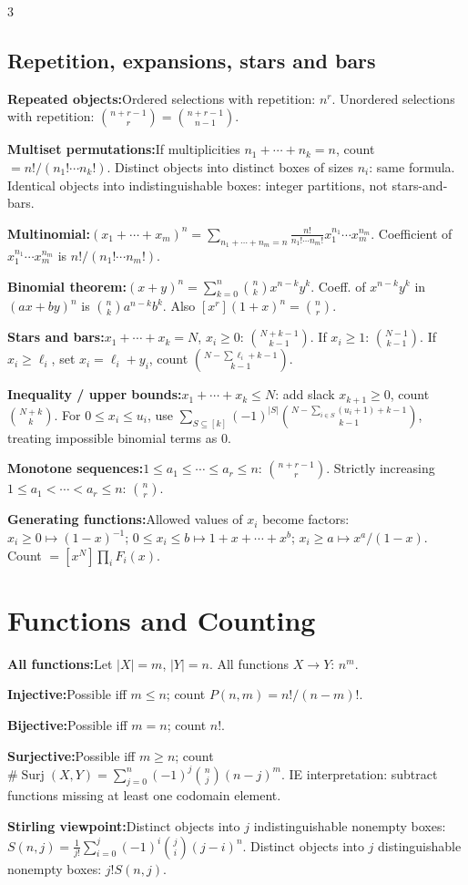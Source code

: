 \documentclass[10pt]{article}
\newcommand{\Surj}{\operatorname{Surj}}
\newenvironment{cheatitems}{\par\vspace{-1pt}}{\par\vspace{-1pt}}
\newcommand{\cheatrow}[2]{\par\noindent\textbf{#1:}\enspace #2\par}
\begin{document}
\begin{multicols}{3}
\subsection*{Repetition, expansions, stars and bars}
\begin{cheatitems}
\cheatrow{Repeated objects}{Ordered selections with repetition: $n^r$. Unordered selections with repetition: $\binom{n+r-1}{r}=\binom{n+r-1}{n-1}$.}
\cheatrow{Multiset permutations}{If multiplicities $n_1+\cdots+n_k=n$, count $=n!/(n_1!\cdots n_k!)$. Distinct objects into distinct boxes of sizes $n_i$: same formula. Identical objects into indistinguishable boxes: integer partitions, not stars-and-bars.}
\cheatrow{Multinomial}{$(x_1+\cdots+x_m)^n=\sum_{n_1+\cdots+n_m=n}\frac{n!}{n_1!\cdots n_m!}x_1^{n_1}\cdots x_m^{n_m}$. Coefficient of $x_1^{n_1}\cdots x_m^{n_m}$ is $n!/(n_1!\cdots n_m!)$.}
\cheatrow{Binomial theorem}{$(x+y)^n=\sum_{k=0}^{n}\binom nkx^{n-k}y^k$. Coeff. of $x^{n-k}y^k$ in $(ax+by)^n$ is $\binom nka^{n-k}b^k$. Also $[x^r](1+x)^n=\binom nr$.}
\cheatrow{Stars and bars}{$x_1+\cdots+x_k=N$, $x_i\ge0$: $\binom{N+k-1}{k-1}$. If $x_i\ge1$: $\binom{N-1}{k-1}$. If $x_i\ge\ell_i$, set $x_i=\ell_i+y_i$, count $\binom{N-\sum\ell_i+k-1}{k-1}$.}
\cheatrow{Inequality / upper bounds}{$x_1+\cdots+x_k\le N$: add slack $x_{k+1}\ge0$, count $\binom{N+k}{k}$. For $0\le x_i\le u_i$, use $\sum_{S\subseteq[k]}(-1)^{|S|}\binom{N-\sum_{i\in S}(u_i+1)+k-1}{k-1}$, treating impossible binomial terms as $0$.}
\cheatrow{Monotone sequences}{$1\le a_1\le\cdots\le a_r\le n$: $\binom{n+r-1}{r}$. Strictly increasing $1\le a_1<\cdots<a_r\le n$: $\binom nr$.}
\cheatrow{Generating functions}{Allowed values of $x_i$ become factors: $x_i\ge0\mapsto(1-x)^{-1}$; $0\le x_i\le b\mapsto1+x+\cdots+x^b$; $x_i\ge a\mapsto x^a/(1-x)$. Count $=[x^N]\prod_iF_i(x)$.}
\end{cheatitems}

\section*{Functions and Counting}
\begin{cheatitems}
\cheatrow{All functions}{Let $|X|=m$, $|Y|=n$. All functions $X\to Y$: $n^m$.}
\cheatrow{Injective}{Possible iff $m\le n$; count $P(n,m)=n!/(n-m)!$.}
\cheatrow{Bijective}{Possible iff $m=n$; count $n!$.}
\cheatrow{Surjective}{Possible iff $m\ge n$; count $\#\Surj(X,Y)=\sum_{j=0}^{n}(-1)^j\binom nj(n-j)^m$. IE interpretation: subtract functions missing at least one codomain element.}
\cheatrow{Stirling viewpoint}{Distinct objects into $j$ indistinguishable nonempty boxes: $S(n,j)=\frac1{j!}\sum_{i=0}^{j}(-1)^i\binom ji(j-i)^n$. Distinct objects into $j$ distinguishable nonempty boxes: $j!S(n,j)$.}
\end{cheatitems}


\end{multicols}
\end{document}
